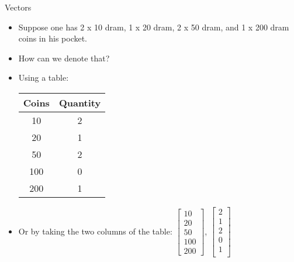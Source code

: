 \documentclass{beamer}
\begin{document}
\begin{frame}{Vectors}
  \begin{itemize}
    \item<1-> Suppose one has 2 x 10 dram, 1 x 20 dram, 2 x 50 dram, and 1 x 200 dram coins in his pocket.
    \item<2-> How can we denote that?
    \item<3-> Using a table: \begin{table}[h]
      \raggedright
      \begin{tabular}{|c|c|}
        \hline
        \textbf{Coins} & \textbf{Quantity} \\
        \hline
        10 & 2\\
        \hline
        20 & 1\\
        \hline
        50 & 2 \\
        \hline
        100 & 0 \\
        \hline
        200 & 1 \\
        \hline
      \end{tabular}
      \label{tab:coins}
    \end{table}
    \item<4-> Or by taking the two columns of the table: $\begin{bmatrix}
10 \\ 20 \\ 50 \\ 100 \\ 200
\end{bmatrix}$, $\begin{bmatrix}
2 \\1 \\2 \\0 \\1 \\
\end{bmatrix}$
  \end{itemize}
\end{frame}
\end{document}

